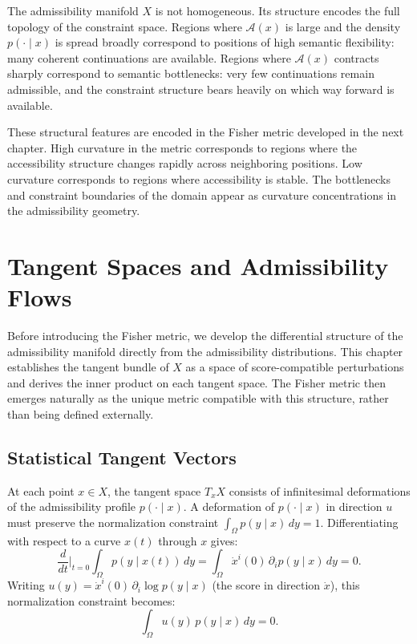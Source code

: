 \documentclass[12pt, oneside]{book}
\theoremstyle{plain-flyxion}
\theoremstyle{definition-flyxion}
\newcommand{\A}{\mathcal{A}}
\begin{document}
The admissibility manifold $X$ is not homogeneous. Its structure encodes the full topology
of the constraint space. Regions where $\A(x)$ is large and the density $p(\cdot\mid x)$
is spread broadly correspond to positions of high semantic flexibility: many coherent
continuations are available. Regions where $\A(x)$ contracts sharply correspond to
semantic bottlenecks: very few continuations remain admissible, and the constraint
structure bears heavily on which way forward is available.

These structural features are encoded in the Fisher metric developed in the next chapter.
High curvature in the metric corresponds to regions where the accessibility structure
changes rapidly across neighboring positions. Low curvature corresponds to regions where
accessibility is stable. The bottlenecks and constraint boundaries of the domain appear
as curvature concentrations in the admissibility geometry.

\chapter{Tangent Spaces and Admissibility Flows}

Before introducing the Fisher metric, we develop the differential structure of the
admissibility manifold directly from the admissibility distributions. This chapter
establishes the tangent bundle of $X$ as a space of score-compatible perturbations and
derives the inner product on each tangent space. The Fisher metric then emerges naturally
as the unique metric compatible with this structure, rather than being defined externally.

\section{Statistical Tangent Vectors}

At each point $x \in X$, the tangent space $T_x X$ consists of infinitesimal deformations
of the admissibility profile $p(\cdot \mid x)$. A deformation of $p(\cdot \mid x)$ in
direction $u$ must preserve the normalization constraint $\int_\Omega p(y \mid x)\, dy =
1$. Differentiating with respect to a curve $x(t)$ through $x$ gives:
\[
\frac{d}{dt}\bigg|_{t=0} \int_\Omega p(y \mid x(t))\, dy
= \int_\Omega \dot x^i(0)\, \partial_i p(y \mid x)\, dy = 0.
\]
Writing $u(y) = \dot x^i(0)\, \partial_i \log p(y \mid x)$ (the score in direction
$\dot x$), this normalization constraint becomes:
\[
\int_\Omega u(y)\, p(y \mid x)\, dy = 0.
\]
\end{document}
